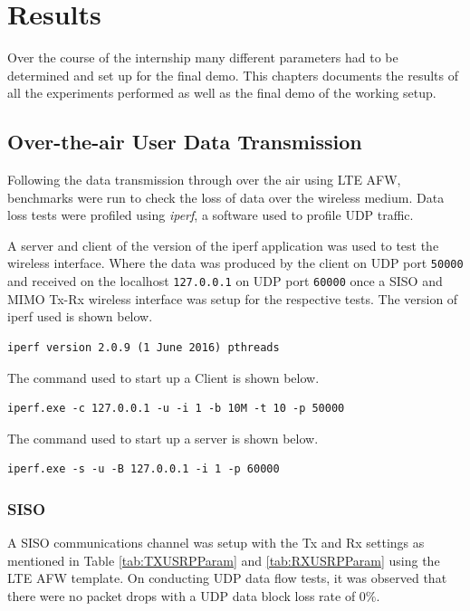 \chapter{Results}
\label{ch:results}

Over the course of the internship many different parameters had to be determined and set up for the final demo. This chapters documents the results of all the experiments performed as well as the final demo of the working setup.

\section{Over-the-air User Data Transmission}\label{sec:OTADataTrans}

Following the data transmission through over the air using LTE AFW, benchmarks were run to check the loss of data over the wireless medium. Data loss tests were profiled using \textit{iperf}, a software used to profile UDP traffic.

A server and client of the version of the iperf application was used to test the wireless interface. Where the data was produced by the client on UDP port \texttt{50000} and received on the localhost \texttt{127.0.0.1} on UDP port \texttt{60000} once a SISO and MIMO Tx-Rx wireless interface was setup for the respective tests. The version of iperf used is shown below.

\begin{lstlisting}[style=DOS]
iperf version 2.0.9 (1 June 2016) pthreads
\end{lstlisting}

The command used to start up a Client is shown below.
\begin{lstlisting}[style=DOS]
iperf.exe -c 127.0.0.1 -u -i 1 -b 10M -t 10 -p 50000
\end{lstlisting}

The command used to start up a server is shown below.
\begin{lstlisting}[style=DOS]
iperf.exe -s -u -B 127.0.0.1 -i 1 -p 60000
\end{lstlisting}

\subsection{SISO}\label{ssec:SISOOTA}

A SISO communications channel was setup with the Tx and Rx settings as mentioned in Table \ref{tab:TXUSRPParam} and \ref{tab:RXUSRPParam} using the LTE AFW template. On conducting UDP data flow tests, it was observed that there were no packet drops with a UDP data block loss rate of $0\%$.

